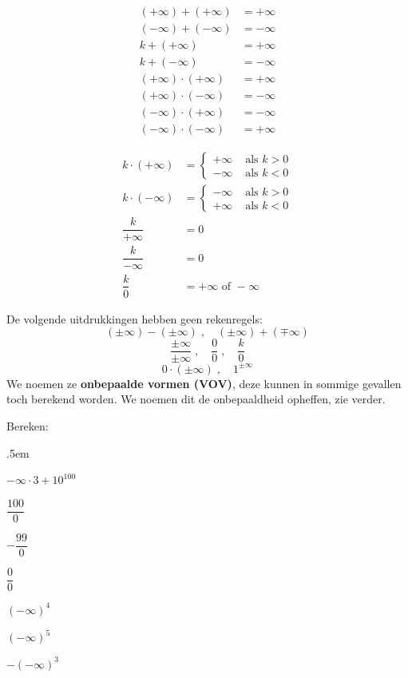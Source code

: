 \documentclass[12pt,twoside,a4paper]{article}
\begin{document}
\begin{multicols}{2}
  \begin{align*}
    (+\infty)+(+\infty) &= +\infty\\
    (-\infty)+(-\infty) &= -\infty\\
    k+(+\infty)&=+\infty\\
    k+(-\infty)&=-\infty\\
    (+\infty)\cdot(+\infty) &= +\infty\\
    (+\infty)\cdot(-\infty) &= -\infty\\
    (-\infty)\cdot(+\infty) &= -\infty\\
    (-\infty)\cdot(-\infty) &= +\infty
  \end{align*}

  \begin{align*}
    k\cdot(+\infty)&=\begin{cases}+\infty & \mbox{ als } k>0\\-\infty & \mbox{ als } k<0\end{cases}\\
    k\cdot(-\infty)&=\begin{cases}-\infty & \mbox{ als } k>0\\+\infty & \mbox{ als } k<0\end{cases}\\
    \dfrac{k}{+\infty}&=0\\
    \dfrac{k}{-\infty}&=0\\
    \dfrac{k}{0} &= +\infty \mbox{ of } -\infty
  \end{align*}
\end{multicols}

De volgende uitdrukkingen hebben geen rekenregels:
$$(\pm\infty)-(\pm\infty)\;,\quad(\pm\infty)+(\mp\infty)$$
$$\dfrac{\pm\infty}{\pm\infty}\;,\quad\dfrac{0}{0}\;,\quad \dfrac{k}{0} $$
$$0\cdot(\pm\infty)\;,\quad 1^{\pm\infty}$$
We noemen ze {\bf onbepaalde vormen (VOV)}, deze kunnen in sommige gevallen
toch berekend worden. We noemen dit de onbepaaldheid opheffen, zie
verder.

\begin{oefening}
Bereken:
\begin{exlist}{2}
  \itemsep.5em
  \item $-\infty\cdot3+10^{100}$
  \item $\dfrac{100}{0}$
  \item $-\dfrac{99}{0}$
  \item $\dfrac{0}{0}$
  \item $(-\infty)^4$
  \item $(-\infty)^5$
  \item $-(-\infty)^3$
\end{exlist}
\end{oefening}
\end{document}
